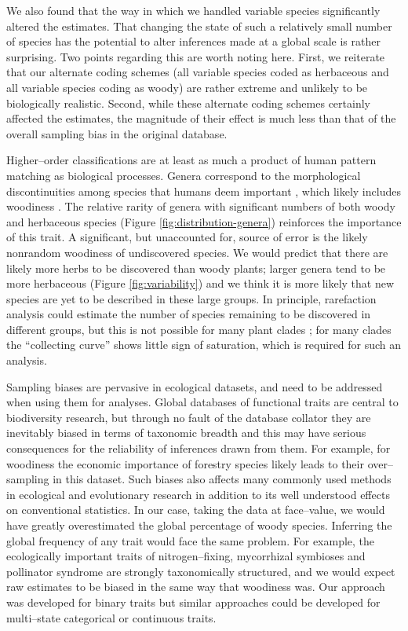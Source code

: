 \documentclass[a4paper,12pt]{article}
\begin{document}
We also found that the way in which we handled variable species
significantly altered the estimates. That changing the state of such a
relatively small number of species has the potential to alter
inferences made at a global scale is rather surprising. Two points regarding this 
are worth noting here. First, we reiterate
that our alternate coding schemes (all variable species coded as herbaceous and all 
variable species coding as woody) are rather extreme and unlikely to be
biologically realistic. Second, while these alternate coding schemes certainly affected
the estimates, the magnitude of their effect is much less than
that of the overall sampling bias in the original database.

Higher--order classifications are at least as much a product of human
pattern matching as biological processes.  Genera correspond to the
morphological discontinuities among species that humans deem important
\citep{scotland2004significance}, which likely includes woodiness
\citep[e.g.,][]{Hutchinson}.  The relative rarity of genera with
significant numbers of both woody and herbaceous species (Figure
\ref{fig:distribution-genera}) reinforces the importance of this
trait.  A significant, but unaccounted for, source of error is the
likely nonrandom woodiness of undiscovered species. We would predict
that there are likely more herbs to be discovered than woody plants;
larger genera tend to be more herbaceous (Figure \ref{fig:variability}) and we
think it is more likely that new species are yet to be described in
these large groups.  In principle, rarefaction analysis could estimate
the number of species remaining to be discovered in different groups,
but this is not possible for many plant clades \citep{costello2011};
for many clades the ``collecting curve'' shows little sign of
saturation, which is required for such an analysis.

Sampling biases are pervasive in
ecological datasets, and need to be addressed when using them for analyses.  Global databases of
functional traits \citep[e.g., TRY;][]{kattge2011try} are central to
biodiversity research, but through no fault of the database collator they
are inevitably biased in terms of taxonomic breadth and this may have
serious consequences for the reliability of inferences drawn from
them.  For example, for woodiness the economic importance of forestry
species likely leads to their over--sampling in this dataset.  Such
biases also affects many commonly used methods in ecological and
evolutionary research
\citep[e.g.,][]{ackerly2000taxon,nakagawa2008missing,pennell2013integrative,Pakeman2013}
in addition to its well understood effects on
conventional statistics.  In our case, taking the data at face--value,
we would have greatly overestimated the global percentage of woody
species.  Inferring the global frequency of any trait would face the
same problem.  For example, the ecologically important traits of
nitrogen--fixing, mycorrhizal symbioses and pollinator syndrome are
strongly taxonomically structured, and we would expect raw estimates
to be biased in the same way that woodiness was.  Our approach was
developed for binary traits but similar approaches could be developed
for multi--state categorical or continuous traits.
\end{document}
